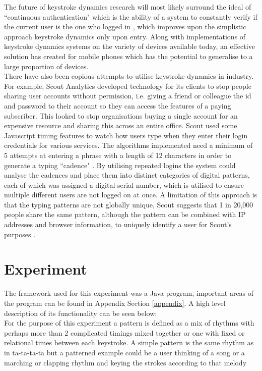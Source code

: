 \documentclass{article}
\begin{document}
The future of keystroke dynamics research will most likely surround the ideal of ``continuous authentication" which is the ability of a system  to constantly verify if the current user is the one who logged in \parencite{sznur2015advances}, which improves upon the simplistic approach keystroke dynamics only upon entry. Along with implementations of keystroke dynamics systems on the variety of devices available today, an effective solution has created for mobile phones \parencite{maiorana2011keystroke} which has the potential to generalise to a large proportion of devices. \\ 

There have also been copious attempts to utilise keystroke dynamics in industry. For example, Scout Analytics developed technology for its clients to stop people sharing user accounts without permission, i.e. giving a friend or colleague the id and password to their account so they can access the features of a paying subscriber. This looked to stop organisations buying a single account for an expensive resource and sharing this across an entire office. Scout used some Javascript timing features to watch how users type when they enter their login credentials for various services. The algorithms implemented need a minimum of 5 attempts at entering a phrase with a length of 12 characters in order to generate a typing ``cadence" \parencite{arsTech}. By utilising repeated logins the system could analyse the cadences and place them into distinct categories of digital patterns, each of which was assigned a digital serial number, which is utilised to ensure multiple different users are not logged on at once. A limitation of this approach is that the typing patterns are not globally unique, Scout suggests that 1 in 20,000 people share the same pattern, although the pattern can be combined with IP addresses and browser information, to uniquely identify a user for Scout's purposes \parencite{arsTech}. 

\section{Experiment} \label{experiment}
The framework used for this experiment was a Java program, important areas of the program can be found in Appendix Section \ref{appendix}. A high level description of its functionality can be seen below: \\

For the purpose of this experiment a pattern is defined as a mix of rhythms with perhaps more than 2 complicated timings mixed together or one with fixed or relational times between each keystroke. A simple pattern is the same rhythm as in ta-ta-ta-ta but a patterned example could be a user thinking of a song or a marching or clapping rhythm and keying the strokes according to that melody
\end{document}
